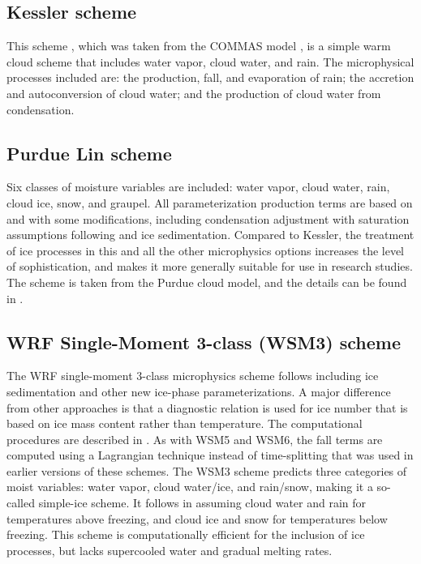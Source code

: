 \subsection{Kessler scheme}

This scheme \citep{kessler69}, which was taken from the COMMAS model
\citep{wicker95}, is a simple 
warm cloud scheme that includes water vapor, cloud water, and rain. 
The microphysical processes included are: the production, fall, and 
evaporation of rain; the accretion and autoconversion of cloud water;
and the production of cloud water from condensation.

\subsection{Purdue Lin scheme}

Six classes of moisture variables are included: water vapor, cloud water, rain, cloud ice, 
snow, and graupel. All parameterization production terms are based on \citet{lin83}
and \citet{rutledge84} with some modifications, including condensation 
adjustment with saturation assumptions following \citet{tao89} and ice sedimentation. Compared to Kessler, the
treatment of ice processes in this and all the other microphysics options increases 
the level of sophistication, and makes it more generally suitable for use 
in research studies. The scheme is taken from the Purdue cloud model, and 
the details can be found in \citet{chen02}.

\subsection{WRF Single-Moment 3-class (WSM3) scheme}

The WRF single-moment 3-class microphysics scheme follows \citet{hong04} including ice sedimentation and other new ice-phase parameterizations. A major difference from other approaches is that a diagnostic relation is used for ice number that is based on ice mass content rather than temperature. The computational procedures are described in \citet{honglim06}. As with WSM5 and WSM6, the fall terms are computed using a Lagrangian technique instead of time-splitting that was used in earlier versions of these schemes. The WSM3 scheme predicts three categories of moist variables: water vapor, cloud water/ice, and rain/snow, making it a so-called simple-ice scheme. It follows \citet{dudhia89} in assuming cloud water and rain for temperatures above freezing, and cloud ice and snow for temperatures below freezing. This scheme is computationally efficient for the inclusion of ice processes, but lacks supercooled water and gradual melting rates. 

